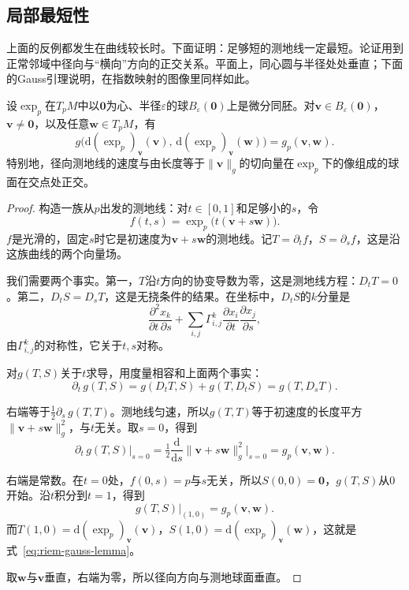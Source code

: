 \subsection{局部最短性}
\label{sec:riem-local-minimality}

上面的反例都发生在曲线较长时。下面证明：足够短的测地线一定最短。论证用到正常邻域中径向与“横向”方向的正交关系。平面上，同心圆与半径处处垂直；下面的Gauss引理说明，在指数映射的图像里同样如此。

\begin{lemma}[Gauss引理]
\label{lem:riem-gauss-lemma}
设$\exp_p$在$T_pM$中以$\bm 0$为心、半径$\varepsilon$的球$B_\varepsilon(\bm 0)$上是微分同胚。对$\bm v\in B_\varepsilon(\bm 0)$，$\bm v\neq\bm 0$，以及任意$\bm w\in T_pM$，有
\begin{equation}
g\bigl(\mathrm d(\exp_p)_{\bm v}(\bm v),\,\mathrm d(\exp_p)_{\bm v}(\bm w)\bigr)=g_p(\bm v,\bm w).
\label{eq:riem-gauss-lemma}
\end{equation}
特别地，径向测地线的速度与由长度等于$\lVert\bm v\rVert_g$的切向量在$\exp_p$下的像组成的球面在交点处正交。
\end{lemma}

\begin{proof}
构造一族从$p$出发的测地线：对$t\in[0,1]$和足够小的$s$，令
\[
f(t,s)=\exp_p\bigl(t(\bm v+s\bm w)\bigr).
\]
$f$是光滑的，固定$s$时它是初速度为$\bm v+s\bm w$的测地线。记$T=\partial_tf$，$S=\partial_sf$，这是沿这族曲线的两个向量场。

我们需要两个事实。第一，$T$沿$t$方向的协变导数为零，这是测地线方程：$D_tT=0$。第二，$D_tS=D_sT$，这是无挠条件的结果。在坐标中，$D_tS$的$k$分量是
\[
\frac{\partial^2x_k}{\partial t\,\partial s}+\sum_{i,j}\Gamma^k_{i,j}\frac{\partial x_i}{\partial t}\frac{\partial x_j}{\partial s},
\]
由$\Gamma^k_{i,j}$的对称性，它关于$t,s$对称。

对$g(T,S)$关于$t$求导，用度量相容和上面两个事实：
\[
\partial_t\,g(T,S)=g(D_tT,S)+g(T,D_tS)=g(T,D_sT).
\]

右端等于$\tfrac12\partial_s\,g(T,T)$。测地线匀速，所以$g(T,T)$等于初速度的长度平方$\lVert\bm v+s\bm w\rVert_g^2$，与$t$无关。取$s=0$，得到
\[
\partial_t\,g(T,S)\big|_{s=0}=\tfrac12\frac{\mathrm d}{\mathrm ds}\lVert\bm v+s\bm w\rVert_g^2\Big|_{s=0}=g_p(\bm v,\bm w).
\]

右端是常数。在$t=0$处，$f(0,s)=p$与$s$无关，所以$S(0,0)=\bm 0$，$g(T,S)$从$0$开始。沿$t$积分到$t=1$，得到
\[
g(T,S)\big|_{(1,0)}=g_p(\bm v,\bm w).
\]
而$T(1,0)=\mathrm d(\exp_p)_{\bm v}(\bm v)$，$S(1,0)=\mathrm d(\exp_p)_{\bm v}(\bm w)$，这就是式~\eqref{eq:riem-gauss-lemma}。

取$\bm w$与$\bm v$垂直，右端为零，所以径向方向与测地球面垂直。
\end{proof}

